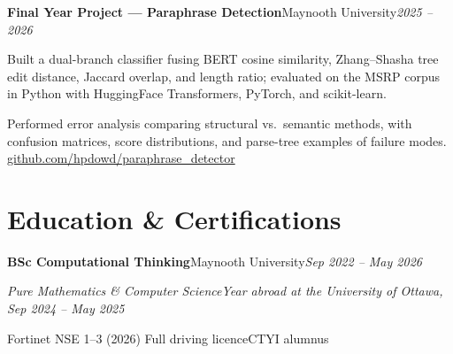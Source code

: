 \documentclass[a4paper,10pt]{article}
\newcommand{\cventry}[3]{\vspace{3pt}\noindent\textbf{#1}\enspace\textperiodcentered\enspace #2\hfill{\small\textit{\color{datesgrey}#3}}\par\vspace{1pt}}
\newcommand{\cvsubtitle}[1]{{\small\textit{\color{datesgrey}#1}\par\vspace{1pt}}}
\begin{document}
\cventry{Final Year Project --- Paraphrase Detection}{Maynooth University}{2025 -- 2026}
\begin{cvitems}
  \item Built a dual-branch classifier fusing BERT cosine similarity, Zhang--Shasha tree edit distance, Jaccard overlap, and length ratio; evaluated on the MSRP corpus in Python with HuggingFace Transformers, PyTorch, and scikit-learn.
  \item Performed error analysis comparing structural vs.\ semantic methods, with confusion matrices, score distributions, and parse-tree examples of failure modes. \href{https://github.com/hpdowd/paraphrase_detector}{github.com/hpdowd/paraphrase\_detector}
\end{cvitems}

\section{Education \& Certifications}
\cventry{BSc Computational Thinking}{Maynooth University}{Sep 2022 -- May 2026}
\cvsubtitle{Pure Mathematics \& Computer Science\enspace\textperiodcentered\enspace Year abroad at the University of Ottawa, Sep 2024 -- May 2025}


\vspace{4pt}
\noindent Fortinet NSE 1--3 (2026)\enspace\textperiodcentered\enspace
Full driving licence\enspace\textperiodcentered\enspace CTYI alumnus
\end{document}
